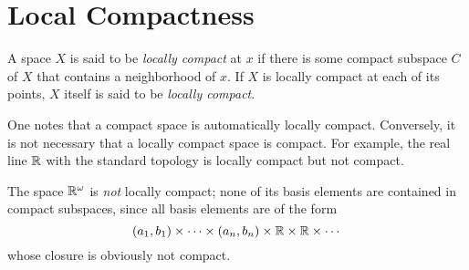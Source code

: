 \section{Local Compactness}
\begin{definition}
    A space $X$ is said to be \textit{locally compact} at $x$ if there is some compact subspace $C$ of $X$ that contains a neighborhood of $x$. If $X$ is locally compact at each of its points, $X$ itself is said to be \textit{locally compact}.
\end{definition}

One notes that a compact space is automatically locally compact. Conversely, it is not necessary that a locally compact space is compact. For example, the real line $\mathbb{R}$ with the standard topology is locally compact but not compact.

The space $\mathbb{R}^\omega$ is \textit{not} locally compact; none of its basis elements are contained in compact subspaces, since all basis elements are of the form 
\begin{equation*}
    (a_1, b_1)\times\cdots\times(a_n,b_n)\times\mathbb{R}\times\mathbb{R}\times\cdots
\end{equation*}
whose closure is obviously not compact.



